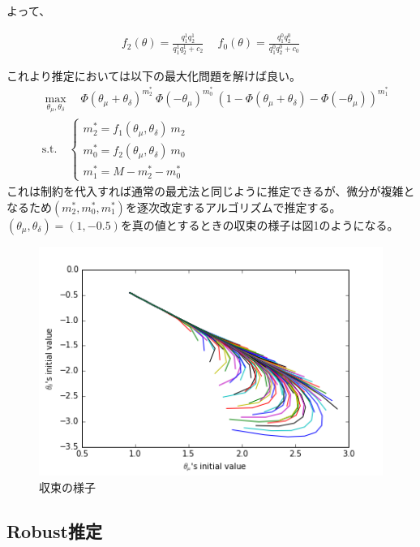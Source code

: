 \documentclass{jsarticle}
\begin{document}
よって、

\begin{align*}
	f_2(\theta) = \frac{q_1^1 q_2^1}{q_1^1 q_2^1+ c_2}\quad\ f_0(\theta) = \frac{q_1^0 q_2^0}{q_1^0 q_2^0+ c_0}
\end{align*}

これより推定においては以下の最大化問題を解けば良い。
\begin{align*}
	&\max_{\theta_{\mu}, \theta_{\delta}}\quad \Phi(\theta_{\mu}+\theta_{\delta})^{m_2^{*}}\ \Phi(-\theta_{\mu})^{m_0^{*}}\  (1- \Phi(\theta_{\mu}+\theta_{\delta}) - \Phi(-\theta_{\mu}))^{m_1^{*}}\\
	&\text{s.t.}\quad \begin{cases}
	m_2^{*} = f_1(\theta_{\mu}, \theta_{\delta})\ m_2\\
	m_0^{*} = f_2(\theta_{\mu}, \theta_{\delta})\ m_0\\
	m_1^{*} = M - m_2^{*} - m_0^{*}
	\end{cases}
\end{align*}
これは制約を代入すれば通常の最尤法と同じように推定できるが、微分が複雑となるため$(m_2^{*},m_0^{*},m_1^{*})$を逐次改定するアルゴリズムで推定する。$(\theta_{\mu}, \theta_{\delta}) = (1, -0.5)$を真の値とするときの収束の様子は図1のようになる。
\begin{figure}[h]
\centering
\includegraphics{conversion.png}
\caption{収束の様子}
\end{figure}

\subsection{Robust推定}
\end{document}
